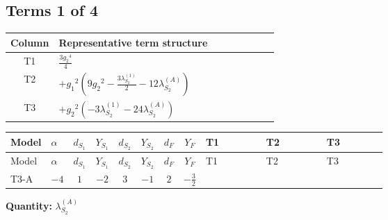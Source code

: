 \documentclass[8pt]{article}
\begin{document}
\begin{landscape}
\subsection*{Terms 1 of 4}
\begin{center}
\begin{tabular}{@{}c >{\raggedright\arraybackslash}p{0.82\linewidth}@{}}
\toprule
Column & Representative term structure \\
\midrule
T1 & \(\displaystyle \frac{3 {g_2}^4}{4}\) \\
\midrule
T2 & \(\displaystyle +{g_1}^2 \left(9 {g_2}^2-\frac{3 {\lambda_{S_2}^{(1)}}}{2}-12 {\lambda_{S_2}^{(A)}}\right)\) \\
\midrule
T3 & \(\displaystyle +{g_2}^2 (-3 {\lambda_{S_2}^{(1)}}-24 {\lambda_{S_2}^{(A)}})\) \\
\midrule
\bottomrule
\end{tabular}
\end{center}
\smallskip
\tiny
\begin{longtable}{@{}llcccccc >{\raggedright\arraybackslash}p{0.21\linewidth} >{\raggedright\arraybackslash}p{0.21\linewidth} >{\raggedright\arraybackslash}p{0.21\linewidth}@{}}
\toprule
Model & $\alpha$ & $d_{S_1}$ & $Y_{S_1}$ & $d_{S_2}$ & $Y_{S_2}$ & $d_F$ & $Y_F$ & T1 & T2 & T3 \\
\midrule
\endfirsthead
\toprule
Model & $\alpha$ & $d_{S_1}$ & $Y_{S_1}$ & $d_{S_2}$ & $Y_{S_2}$ & $d_F$ & $Y_F$ & T1 & T2 & T3 \\
\midrule
\endhead
T3-A & $-4$ & $1$ & $-2$ & $3$ & $-1$ & $2$ & $-\frac{3}{2}$ & \scriptsize\adjustbox{max width=\linewidth}{$\begin{gathered} \frac{3 {g_2}^4}{4}\end{gathered}$} & \scriptsize\adjustbox{max width=\linewidth}{$\begin{gathered} +{g_1}^2 \left(9 {g_2}^2-\frac{3 {\lambda_{S_2}^{(1)}}}{2}-12 {\lambda_{S_2}^{(A)}}\right)\end{gathered}$} & \scriptsize\adjustbox{max width=\linewidth}{$\begin{gathered} +{g_2}^2 (-3 {\lambda_{S_2}^{(1)}}-24 {\lambda_{S_2}^{(A)}})\end{gathered}$} \\
\midrule
\bottomrule
\end{longtable}
\clearpage
\noindent\textbf{Quantity: }$\lambda_{S_2}^{(A)}$\par\smallskip

\end{landscape}
\end{document}
